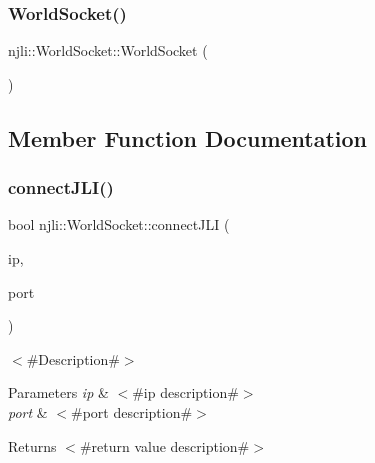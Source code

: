 \subsubsection{\texorpdfstring{World\+Socket()}{WorldSocket()}\hspace{0.1cm}{\footnotesize\ttfamily [2/2]}}
{\footnotesize\ttfamily njli\+::\+World\+Socket\+::\+World\+Socket (\begin{DoxyParamCaption}\item[{const \mbox{\hyperlink{classnjli_1_1_world_socket}{World\+Socket}} \&}]{ }\end{DoxyParamCaption})\hspace{0.3cm}{\ttfamily [private]}}



\subsection{Member Function Documentation}
\mbox{\label{classnjli_1_1_world_socket_a9fa97067d750876046d8a0b79eaa2708}} 
\subsubsection{\texorpdfstring{connect\+J\+L\+I()}{connectJLI()}}
{\footnotesize\ttfamily bool njli\+::\+World\+Socket\+::connect\+J\+LI (\begin{DoxyParamCaption}\item[{const char $\ast$}]{ip,  }\item[{\mbox{\hyperlink{_util_8h_a9e6c91d77e24643b888dbd1a1a590054}{u16}}}]{port }\end{DoxyParamCaption})}

$<$\#\+Description\#$>$


\begin{DoxyParams}{Parameters}
{\em ip} & $<$\#ip description\#$>$ \\
\hline
{\em port} & $<$\#port description\#$>$\\
\hline
\end{DoxyParams}
\begin{DoxyReturn}{Returns}
$<$\#return value description\#$>$ 
\end{DoxyReturn}
\mbox{\label{classnjli_1_1_world_socket_af3e1664b23b7ded9a695c51140a8c209}} 

